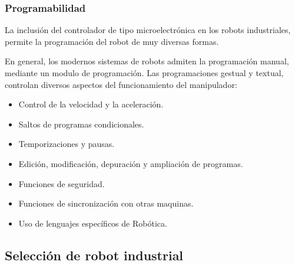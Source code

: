 \documentclass[12pt,a4papert,woside,openright,titlepage,final]{book}
\begin{document}
\subsubsection{Programabilidad}

La inclusión del controlador de tipo microelectrónica en los robots
industriales, permite la programación del robot de muy diversas formas.

En general, los modernos sistemas de robots admiten la programación manual,
mediante un modulo de programación. Las programaciones gestual y textual,
controlan diversos aspectos del funcionamiento del manipulador:

\begin{itemize}
    \item Control de la velocidad y la aceleración.  
    \item Saltos de programas condicionales.  
    \item Temporizaciones y pausas.  
    \item Edición, modificación, depuración y ampliación de programas.  
    \item Funciones de seguridad.  
    \item Funciones de sincronización con otras maquinas.  
    \item Uso de lenguajes específicos de Robótica.
\end{itemize}


\subsection{Selección de robot industrial}
\end{document}
